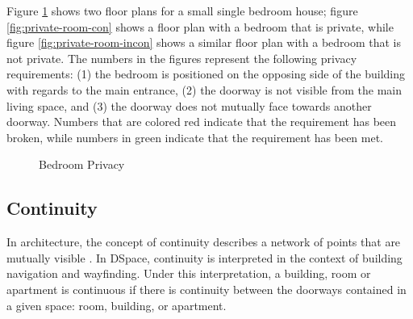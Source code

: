 \documentclass[12pt]{ucthesis}
\begin{document}
Figure \ref{room-privacy} shows two floor plans for a small single bedroom house; figure \ref{fig:private-room-con} shows a floor plan with a bedroom that is  private, while figure \ref{fig:private-room-incon} shows a similar floor plan with a bedroom that is not private. The numbers in the figures represent the following privacy requirements: (1) the bedroom is positioned on the opposing side of the building with regards to the main entrance, (2) the doorway is not visible from the main living space, and (3) the doorway does not mutually face towards another doorway. Numbers that are colored red indicate that the requirement has been broken, while numbers in green indicate that the requirement has been met.

\begin{figure}[H]
 \centering
  \hspace{5mm}
 \caption{Bedroom Privacy}
\label{room-privacy}
\end{figure}

\subsection{Continuity}
In architecture, the concept of continuity describes a network of points that are mutually visible \cite{Key}. In DSpace, continuity is interpreted in the context of building navigation and wayfinding. Under this interpretation, a building, room or apartment is continuous if there is continuity between the doorways contained in a given space: room, building, or apartment. 
\end{document}
